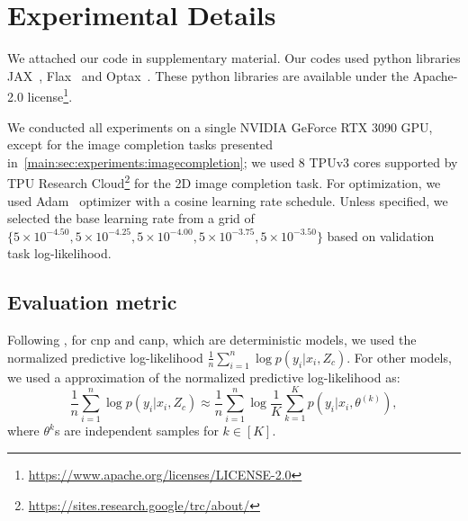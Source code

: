 \section{Experimental Details}
\label{app:sec:details}
We attached our code in supplementary material. Our codes used python libraries JAX~\citep{jax2018github}, Flax~\citep{flax2020github} and Optax~\citep{optax2020github}. 
These python libraries are available under the Apache-2.0 license\footnote{\href{https://www.apache.org/licenses/LICENSE-2.0}{https://www.apache.org/licenses/LICENSE-2.0}}.


We conducted all experiments on a single NVIDIA GeForce RTX 3090 GPU, except for the image completion tasks presented in~\cref{main:sec:experiments:imagecompletion}; we used 8 TPUv3 cores supported by TPU Research Cloud\footnote{\href{https://sites.research.google/trc/about/}{https://sites.research.google/trc/about/}} for the 2D image completion task. For optimization, we used Adam~\citep{kingma2015adam} optimizer with a cosine learning rate schedule. Unless specified, we selected the base learning rate from a grid of $\{5 \times 10^{-4.50}, 5 \times 10^{-4.25}, 5 \times 10^{-4.00}, 5 \times 10^{-3.75}, 5 \times 10^{-3.50}\}$ based on validation task log-likelihood.




\subsection{Evaluation metric}
Following \citet{le2018empirical},  for \gls{cnp} and \gls{canp}, which are deterministic models, we used the normalized predictive log-likelihood $\frac{1}{n}\sum_{i=1}^n\log p(y_i|x_i,Z_c)$. For other models, we used a approximation of the normalized predictive log-likelihood as:
\[
\frac{1}{n}\sum_{i=1}^n\log p(y_i|x_i,Z_c)\approx \frac{1}{n}\sum_{i=1}^n\log\frac{1}{K}\sum_{k=1}^K p(y_i|x_i,\theta^{(k)}),
\]
where $\theta^{k}$s are independent samples for $k\in[K]$.
